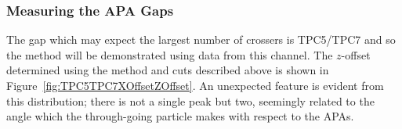 \subsubsection{Measuring the APA Gaps}\label{sec:MeasuringAPAGaps}

The gap which may expect the largest number of crossers is TPC5/TPC7 and so the method will be demonstrated using data from this channel.  The $z$-offset determined using the method and cuts described above is shown in Figure~\ref{fig:TPC5TPC7XOffsetZOffset}.  An unexpected feature is evident from this distribution; there is not a single peak but two, seemingly related to the angle which the through-going particle makes with respect to the APAs.

